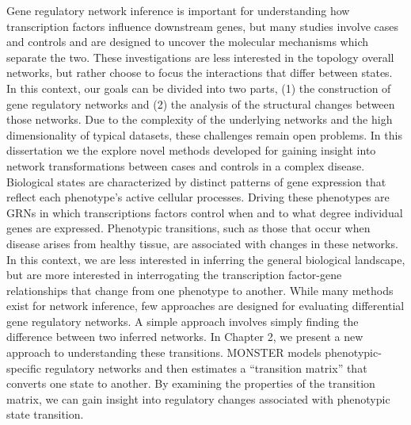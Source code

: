 Gene regulatory network inference is important for understanding how transcription factors influence downstream genes, but many studies involve cases and controls and are designed to uncover the molecular mechanisms which separate the two. These investigations are less interested in the topology overall networks, but rather choose to focus the interactions that differ between states. In this context, our goals can be divided into two parts, (1) the construction of gene regulatory networks and (2) the analysis of the structural changes between those networks. Due to the complexity of the underlying networks and the high dimensionality of typical datasets, these challenges remain open problems. In this dissertation we the explore novel methods developed for gaining insight into network transformations between cases and controls in a complex disease.
Biological states are characterized by distinct patterns of gene expression that reflect each phenotype's active cellular processes. Driving these phenotypes are GRNs in which transcriptions factors control when and to what degree individual genes are expressed. Phenotypic transitions, such as those that occur when disease arises from healthy tissue, are associated with changes in these networks. In this context, we are less interested in inferring the general biological landscape, but are more interested in interrogating the transcription factor-gene relationships that change from one phenotype to another. While many methods exist for network inference, few approaches are designed for evaluating differential gene regulatory networks.  A simple approach involves simply finding the difference between two inferred networks. In Chapter 2, we present a new approach to understanding these transitions. MONSTER models phenotypic-specific regulatory networks and then estimates a ``transition matrix'' that converts one state to another. By examining the properties of the transition matrix, we can gain insight into regulatory changes associated with phenotypic state transition.
